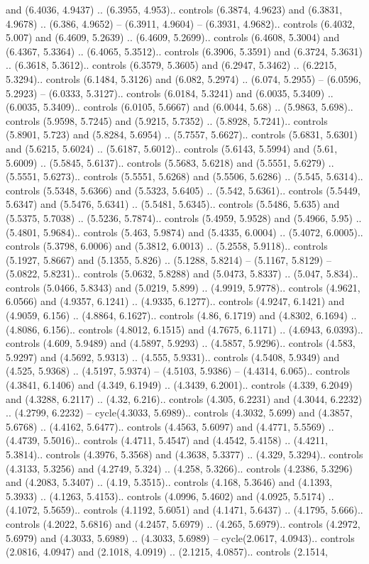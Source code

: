 and (6.4036, 4.9437) .. (6.3955, 4.953).. controls (6.3874, 4.9623) and (6.3831, 4.9678) .. (6.386, 4.9652) -- (6.3911, 4.9604) -- (6.3931, 4.9682).. controls (6.4032, 5.007) and (6.4609, 5.2639) .. (6.4609, 5.2699).. controls (6.4608, 5.3004) and (6.4367, 5.3364) .. (6.4065, 5.3512).. controls (6.3906, 5.3591) and (6.3724, 5.3631) .. (6.3618, 5.3612).. controls (6.3579, 5.3605) and (6.2947, 5.3462) .. (6.2215, 5.3294).. controls (6.1484, 5.3126) and (6.082, 5.2974) .. (6.074, 5.2955) -- (6.0596, 5.2923) -- (6.0333, 5.3127).. controls (6.0184, 5.3241) and (6.0035, 5.3409) .. (6.0035, 5.3409).. controls (6.0105, 5.6667) and (6.0044, 5.68) .. (5.9863, 5.698).. controls (5.9598, 5.7245) and (5.9215, 5.7352) .. (5.8928, 5.7241).. controls (5.8901, 5.723) and (5.8284, 5.6954) .. (5.7557, 5.6627).. controls (5.6831, 5.6301) and (5.6215, 5.6024) .. (5.6187, 5.6012).. controls (5.6143, 5.5994) and (5.61, 5.6009) .. (5.5845, 5.6137).. controls (5.5683, 5.6218) and (5.5551, 5.6279) .. (5.5551, 5.6273).. controls (5.5551, 5.6268) and (5.5506, 5.6286) .. (5.545, 5.6314).. controls (5.5348, 5.6366) and (5.5323, 5.6405) .. (5.542, 5.6361).. controls (5.5449, 5.6347) and (5.5476, 5.6341) .. (5.5481, 5.6345).. controls (5.5486, 5.635) and (5.5375, 5.7038) .. (5.5236, 5.7874).. controls (5.4959, 5.9528) and (5.4966, 5.95) .. (5.4801, 5.9684).. controls (5.463, 5.9874) and (5.4335, 6.0004) .. (5.4072, 6.0005).. controls (5.3798, 6.0006) and (5.3812, 6.0013) .. (5.2558, 5.9118).. controls (5.1927, 5.8667) and (5.1355, 5.826) .. (5.1288, 5.8214) -- (5.1167, 5.8129) -- (5.0822, 5.8231).. controls (5.0632, 5.8288) and (5.0473, 5.8337) .. (5.047, 5.834).. controls (5.0466, 5.8343) and (5.0219, 5.899) .. (4.9919, 5.9778).. controls (4.9621, 6.0566) and (4.9357, 6.1241) .. (4.9335, 6.1277).. controls (4.9247, 6.1421) and (4.9059, 6.156) .. (4.8864, 6.1627).. controls (4.86, 6.1719) and (4.8302, 6.1694) .. (4.8086, 6.156).. controls (4.8012, 6.1515) and (4.7675, 6.1171) .. (4.6943, 6.0393).. controls (4.609, 5.9489) and (4.5897, 5.9293) .. (4.5857, 5.9296).. controls (4.583, 5.9297) and (4.5692, 5.9313) .. (4.555, 5.9331).. controls (4.5408, 5.9349) and (4.525, 5.9368) .. (4.5197, 5.9374) -- (4.5103, 5.9386) -- (4.4314, 6.065).. controls (4.3841, 6.1406) and (4.349, 6.1949) .. (4.3439, 6.2001).. controls (4.339, 6.2049) and (4.3288, 6.2117) .. (4.32, 6.216).. controls (4.305, 6.2231) and (4.3044, 6.2232) .. (4.2799, 6.2232) -- cycle(4.3033, 5.6989).. controls (4.3032, 5.699) and (4.3857, 5.6768) .. (4.4162, 5.6477).. controls (4.4563, 5.6097) and (4.4771, 5.5569) .. (4.4739, 5.5016).. controls (4.4711, 5.4547) and (4.4542, 5.4158) .. (4.4211, 5.3814).. controls (4.3976, 5.3568) and (4.3638, 5.3377) .. (4.329, 5.3294).. controls (4.3133, 5.3256) and (4.2749, 5.324) .. (4.258, 5.3266).. controls (4.2386, 5.3296) and (4.2083, 5.3407) .. (4.19, 5.3515).. controls (4.168, 5.3646) and (4.1393, 5.3933) .. (4.1263, 5.4153).. controls (4.0996, 5.4602) and (4.0925, 5.5174) .. (4.1072, 5.5659).. controls (4.1192, 5.6051) and (4.1471, 5.6437) .. (4.1795, 5.666).. controls (4.2022, 5.6816) and (4.2457, 5.6979) .. (4.265, 5.6979).. controls (4.2972, 5.6979) and (4.3033, 5.6989) .. (4.3033, 5.6989) -- cycle(2.0617, 4.0943).. controls (2.0816, 4.0947) and (2.1018, 4.0919) .. (2.1215, 4.0857).. controls (2.1514, 
